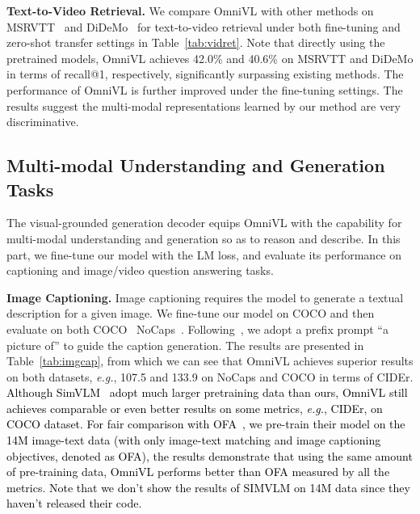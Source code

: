 \documentclass{article}
\makeatletter
\newcommand*{\system}{OmniVL\@\xspace}
\newcommand*{\eg}{\emph{e.g.}\@\xspace}
\newcommand{\red}[1]{\textcolor{black}{#1}}
\makeatother
\begin{document}
\noindent \textbf{Text-to-Video Retrieval.} We compare \system with other methods on MSRVTT~\cite{xu2016msr} and DiDeMo~\cite{anne2017localizing} for text-to-video retrieval under both fine-tuning and zero-shot transfer settings in Table~\ref{tab:vidret}. Note that directly using the pretrained models, \system achieves 42.0\% and 40.6\% on MSRVTT and DiDeMo in terms of recall@1, respectively, significantly surpassing existing methods. The performance of \system is further improved under the fine-tuning settings. The results suggest the multi-modal representations learned by our method are very discriminative.

\subsection{Multi-modal Understanding and Generation Tasks}
\label{sec:und_gen}
The visual-grounded generation decoder equips \system with the capability for multi-modal understanding and generation so as to reason and describe. In this part, we fine-tune our model with the LM loss, and evaluate its performance on captioning and image/video question answering tasks.


\noindent \textbf{Image Captioning.} Image captioning requires the model to generate a textual description for a given image. We fine-tune our model on COCO and then evaluate on both COCO~\cite{lin2014microsoft} NoCaps~\cite{agrawal2019nocaps}. Following~\cite{wang2022simvlm,li2022blip}, we adopt a prefix prompt ``a picture of'' to guide the caption generation. The results are presented in Table~\ref{tab:imgcap}, from which we can see that \system achieves superior results on both datasets, \eg, 107.5 and 133.9 on NoCaps and COCO in terms of CIDEr. \red{Although SimVLM~\cite{wang2022simvlm} adopt much larger pretraining data than ours, \system still achieves comparable or even better results on some metrics, \eg, CIDEr, on COCO dataset. For fair comparison with OFA~\cite{wang2022OFA}, we pre-train their model on the 14M image-text data (with only image-text matching and image captioning objectives, denoted as OFA), the results demonstrate that using the same amount of pre-training data, \system performs better than OFA measured by all the metrics. Note that we don't show the results of SIMVLM on 14M data since they haven't released their code.}
\end{document}

